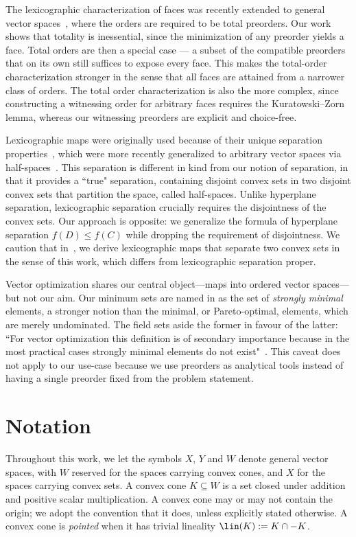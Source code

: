 \documentclass{article}
\theoremstyle{plain}
\theoremstyle{definition}
\theoremstyle{remark}
\begin{document}
The lexicographic characterization of faces was recently extended to general vector spaces~\cite{gorokhovikCharacterizationsFacesConvex2026},
where the orders are required to be total preorders. Our work shows that totality is inessential, since the minimization of any preorder yields a face.
Total orders are then
a special case --- a subset of the compatible preorders that on its own still suffices
to expose every face. This makes the total-order characterization stronger in the sense that all faces are attained from a narrower class of orders. 
The total order characterization is also the more complex, since constructing
a witnessing order for arbitrary faces requires the Kuratowski--Zorn lemma,
whereas our witnessing preorders are explicit and choice-free.

Lexicographic maps were originally used because of their unique separation properties~\cite{martinez-legazLexicographicalSeparationRn1987},
which were more recently generalized to arbitrary vector spaces via half-spaces~\cite{gorokhovikStepAffineFunctionsHalfspaces2021}.
This separation is different in kind from our
notion of separation, in that it provides a ``true" separation, containing
disjoint convex sets in two disjoint convex sets that partition the space, called half-spaces.
Unlike hyperplane separation, lexicographic separation crucially requires the disjointness of the convex sets.
Our approach is opposite: we generalize the formula of hyperplane separation
$f(D) \le f(C)$ while dropping the requirement of disjointness.
We caution that in~,
we derive lexicographic maps that separate two convex sets
in the sense of this work, which 
differs from lexicographic separation proper.

Vector optimization shares our central object---maps into ordered vector
spaces---but not our aim. Our minimum sets are named in \cite[Definition 2.4.4]{botDualityVectorOptimization2009} as the set of \emph{strongly minimal} elements, a stronger notion than the minimal, or Pareto-optimal, elements, which are merely undominated. The field 
sets aside the former in favour of the latter: ``For vector optimization this definition is of secondary importance because in the most practical cases strongly minimal elements do not exist"~\cite[p. 45]{botDualityVectorOptimization2009}. This caveat does
not apply to our use-case because we use preorders
as analytical tools instead of having a single preorder fixed from the problem
statement.
\section{Notation}
\label{loc:body.notation}
Throughout this work, we let the symbols $X$, $Y$ and $W$ denote general vector spaces,
with $W$ reserved for the spaces carrying convex cones, and $X$ for the spaces carrying convex sets.
A convex cone $K \subseteq W$ is a set closed under addition and positive
scalar multiplication. A convex cone may or may not contain the origin; we
adopt the convention that it does, unless
explicitly stated otherwise.
A convex cone is \emph{pointed} when it has trivial lineality $\lin(K):= K \cap -K$.
\end{document}
